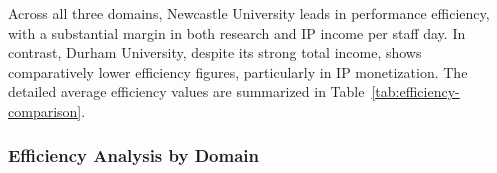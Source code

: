 \documentclass[journal,onecolumn, 10pt,draftclsnofoot]{IEEEtran}
\begin{document}
Across all three domains, Newcastle University leads in performance efficiency, with a substantial margin in both research and IP income per staff day. In contrast, Durham University, despite its strong total income, shows comparatively lower efficiency figures, particularly in IP monetization. The detailed average efficiency values are summarized in Table~\ref{tab:efficiency-comparison}.
\vspace{0.25cm}
\begin{table}[h]
\centering
\caption{North East University Efficiency Comparison}
\vspace{0.1cm}
\label{tab:efficiency-comparison}
\end{table}

\subsubsection{Efficiency Analysis by Domain}
\end{document}
